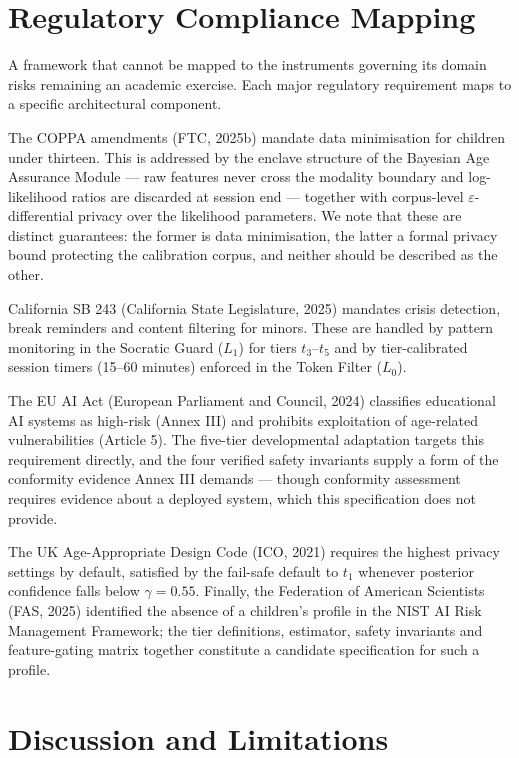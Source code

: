 \documentclass[fleqn,10pt]{wlscirep}
\begin{document}
\section*{Regulatory Compliance Mapping}

A framework that cannot be mapped to the instruments governing its domain risks remaining an academic exercise. Each major regulatory requirement maps to a specific architectural component.

The COPPA amendments (FTC, 2025b)\cite{FTC2025b} mandate data minimisation for children under thirteen. This is addressed by the enclave structure of the Bayesian Age Assurance Module --- raw features never cross the modality boundary and log-likelihood ratios are discarded at session end --- together with corpus-level $\varepsilon$-differential privacy over the likelihood parameters. We note that these are distinct guarantees: the former is data minimisation, the latter a formal privacy bound protecting the calibration corpus, and neither should be described as the other.

California SB 243 (California State Legislature, 2025)\cite{California2025} mandates crisis detection, break reminders and content filtering for minors. These are handled by pattern monitoring in the Socratic Guard ($L_1$) for tiers $t_3$--$t_5$ and by tier-calibrated session timers (15--60 minutes) enforced in the Token Filter ($L_0$).

The EU AI Act (European Parliament and Council, 2024)\cite{EUAI2024} classifies educational AI systems as high-risk (Annex III) and prohibits exploitation of age-related vulnerabilities (Article 5). The five-tier developmental adaptation targets this requirement directly, and the four verified safety invariants supply a form of the conformity evidence Annex III demands --- though conformity assessment requires evidence about a deployed system, which this specification does not provide.

The UK Age-Appropriate Design Code (ICO, 2021)\cite{ICO2021} requires the highest privacy settings by default, satisfied by the fail-safe default to $t_1$ whenever posterior confidence falls below $\gamma = 0.55$. Finally, the Federation of American Scientists (FAS, 2025)\cite{FAS2025} identified the absence of a children's profile in the NIST AI Risk Management Framework; the tier definitions, estimator, safety invariants and feature-gating matrix together constitute a candidate specification for such a profile.

\section*{Discussion and Limitations}
\end{document}
